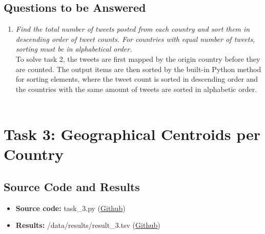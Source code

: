 \documentclass{article}
\begin{document}
\subsection*{Questions to be Answered}
\begin{enumerate}[label=\alph*)]
    \item \textit{Find the total number of tweets posted from each country and sort them in descending order of tweet counts. For countries with equal number of tweets, sorting must be in alphabetical order.}\\
    
    To solve task 2, the tweets are first mapped by the origin country before they are counted. The output items are then sorted by the built-in Python method for sorting elements, where the tweet count is sorted in descending order and the countries with the same amount of tweets are sorted in alphabetic order.\\ \\
\end{enumerate}
\newpage

\section*{Task 3: Geographical Centroids per Country}
\subsection*{Source Code and Results}
    \begin{itemize}
        \item \textbf{Source code:} task\_3.py (\href{https://github.com/FredrikBakken/TDT4305_Big-Data-Project/blob/master/PhaseOne/task_3.py}{Github})
        \item \textbf{Results:} /data/results/result\_3.tsv (\href{https://github.com/FredrikBakken/TDT4305_Big-Data-Project/blob/master/PhaseOne/data/results/result_3.tsv}{Github})
    \end{itemize}
\end{document}
